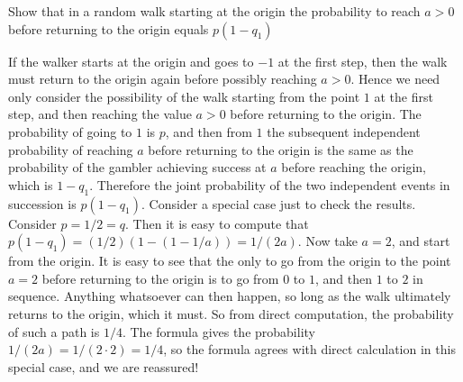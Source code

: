 \begin{problem}
 Show that in a random walk starting at the origin the
    probability to reach  $a>0$ before returning to the origin
    equals $p(1-q_1)$

\begin{sol}

If the walker starts at the origin and
goes to $-1$ at the first step, then the walk must return to
the origin again before possibly reaching $a>0$.  Hence we
need only consider the possibility of the walk starting from
the point $1$ at the first step, and then reaching the value
$a>0$ before returning to the origin.  The probability of
going to $1$ is $p$, and then from $1$ the subsequent
independent probability of reaching $a$ before returning to
the origin is the same as the probability of the gambler
achieving success at $a$ before reaching the origin, which is
$1-q_{1}$.  Therefore the joint probability of the two
independent events
in succession is $p(1-q_{1})$.
Consider a special case just to check the results.  Consider $p =  1/2 = q$.
Then it is easy to compute that $p(1-q_1) = (1/2)(1 - (1 - 1/a)) = 1/(2a)$.
Now take $a = 2$, and start from the origin.  It is easy to see that the only to go from
the origin to the point $a=2$ before returning to the origin is
to go from $0$ to $1$, and then $1$ to $2$ in sequence.
Anything whatsoever can then happen, so long as the walk
ultimately returns to the origin, which it must.  So from direct
computation, the probability of such a path is $1/4$.  The
formula gives the probability $1/(2a) = 1/(2 \cdot 2) = 1/4$, so the
formula agrees with direct calculation in this special case,
and we are reassured!
\end{sol}
\end{problem}

